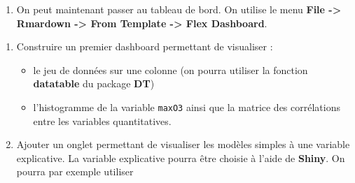 \documentclass[]{article}
\newenvironment{Shaded}{\begin{snugshade}}{\end{snugshade}}
\newcommand{\DataTypeTok}[1]{\textcolor[rgb]{0.13,0.29,0.53}{#1}}
\newcommand{\KeywordTok}[1]{\textcolor[rgb]{0.13,0.29,0.53}{\textbf{#1}}}
\newcommand{\NormalTok}[1]{#1}
\newcommand{\OperatorTok}[1]{\textcolor[rgb]{0.81,0.36,0.00}{\textbf{#1}}}
\newcommand{\StringTok}[1]{\textcolor[rgb]{0.31,0.60,0.02}{#1}}
\providecommand{\tightlist}{%
  \setlength{\itemsep}{0pt}\setlength{\parskip}{0pt}}
\theoremstyle{definition}
\theoremstyle{definition}
\theoremstyle{definition}
\theoremstyle{remark}
\begin{document}
\begin{Shaded}
\end{Shaded}

\begin{enumerate}
\def\labelenumi{\arabic{enumi}.}
\setcounter{enumi}{1}
\tightlist
\item
  On peut maintenant passer au tableau de bord. On utilise le menu \textbf{File -\textgreater{} Rmardown -\textgreater{} From Template -\textgreater{} Flex Dashboard}.
\end{enumerate}

\begin{enumerate}
\def\labelenumi{\alph{enumi}.}
\tightlist
\item
  Construire un premier dashboard permettant de visualiser :

  \begin{itemize}
  \tightlist
  \item
    le jeu de données sur une colonne (on pourra utiliser la fonction \textbf{datatable} du package \textbf{DT})
  \item
    l'histogramme de la variable \texttt{maxO3} ainsi que la matrice des corrélations entre les variables quantitatives.
  \end{itemize}
\item
  Ajouter un onglet permettant de visualiser les modèles simples à une variable explicative. La variable explicative pourra être choisie à l'aide de \textbf{Shiny}. On pourra par exemple utiliser
\end{enumerate}
\end{document}
